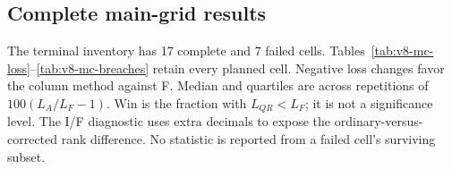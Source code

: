 \subsection{Complete main-grid results}\label{sup:v8-mc-results}

The terminal inventory has 17 complete and 7 failed cells. Tables~\ref{tab:v8-mc-loss}--\ref{tab:v8-mc-breaches} retain every planned cell. Negative loss changes favor the column method against F. Median and quartiles are across repetitions of $100(L_A/L_F-1)$. Win is the fraction with $L_{QR}<L_F$; it is not a significance level. The I/F diagnostic uses extra decimals to expose the ordinary-versus-corrected rank difference. No statistic is reported from a failed cell's surviving subset.

\begingroup\scriptsize\setlength{\tabcolsep}{4pt}\renewcommand{\arraystretch}{1.12}

